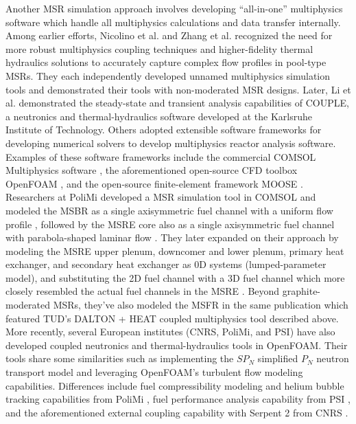 Another \gls{MSR} simulation approach involves developing ``all-in-one''
multiphysics software which handle all multiphysics calculations and data
transfer internally. Among earlier efforts, Nicolino et al.
\cite{nicolino_coupled_2008} and Zhang et al. \cite{zhang_development_2009}
recognized the
need for more robust multiphysics coupling techniques and higher-fidelity
thermal hydraulics solutions to accurately capture complex flow profiles in
pool-type \glspl{MSR}. They each independently developed unnamed multiphysics
simulation tools and demonstrated their tools with non-moderated \gls{MSR}
designs. Later, Li et al. \cite{li_transient_2015} demonstrated the
steady-state and transient analysis capabilities of COUPLE, a neutronics and
thermal-hydraulics software developed at the Karlsruhe Institute of Technology.
Others adopted extensible software frameworks for developing numerical solvers
to develop multiphysics reactor analysis software. Examples of these software
frameworks include the commercial COMSOL Multiphysics software
\cite{comsol_ab_comsol_2018}, the aforementioned open-source CFD toolbox
OpenFOAM \cite{openfoam_openfoam_2021}, and the open-source finite-element
framework \gls{MOOSE} \cite{gaston_physics-based_2015}. Researchers at
\gls{PoliMi} developed a \gls{MSR} simulation tool in COMSOL and
modeled the \gls{MSBR} as a single axisymmetric fuel channel with a uniform
flow profile \cite{cammi_multi-physics_2011}, followed by the \gls{MSRE} core
also as a single axisymmetric fuel channel with parabola-shaped laminar flow
\cite{cammi_dimensional_2012}. They later expanded on their approach by
modeling the \gls{MSRE} upper plenum, downcomer and lower plenum, primary heat
exchanger, and secondary heat exchanger as 0D systems (lumped-parameter model),
and substituting the 2D fuel channel with a 3D fuel channel which more closely
resembled the actual fuel channels in the \gls{MSRE}
\cite{zanetti_geometric_2015}. Beyond graphite-moderated \glspl{MSR}, they've
also modeled the \gls{MSFR} in the same publication which featured \gls{TUD}'s
DALTON + HEAT coupled multiphysics tool described
above. More recently, several European institutes (\gls{CNRS}, \gls{PoliMi},
and \gls{PSI}) have also developed coupled neutronics and
thermal-hydraulics tools in OpenFOAM. Their tools share some
similarities such as implementing the $SP_N$ simplified $P_N$ neutron transport
model and leveraging OpenFOAM's turbulent flow modeling capabilities.
Differences include fuel compressibility modeling and helium bubble tracking
capabilities from \gls{PoliMi} \cite{cervi_development_2019}, fuel
performance analysis capability from \gls{PSI} \cite{fiorina_creation_2018},
and the aforementioned external coupling capability with Serpent 2 from
\gls{CNRS} \cite{blanco_neutronic_2020}.

